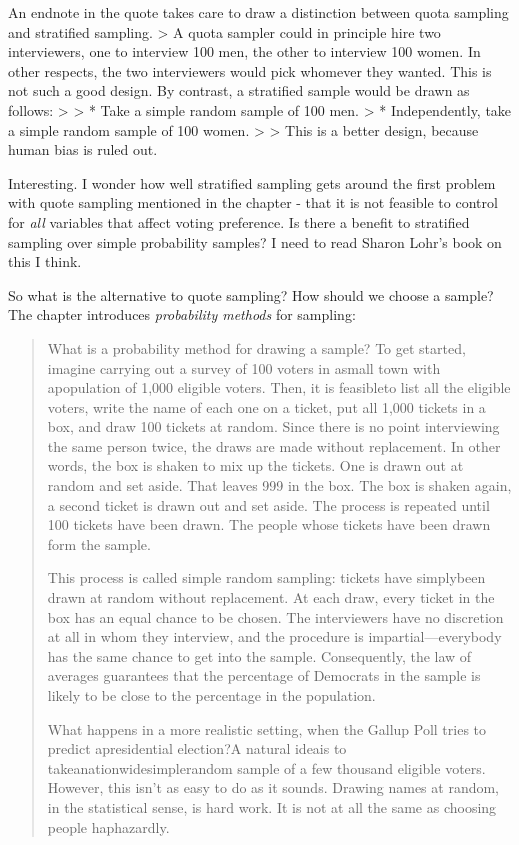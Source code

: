 \documentclass[
]{book}
\begin{document}
An endnote in the quote takes care to draw a distinction between quota sampling and stratified sampling.
\textgreater{} A quota sampler could in principle hire two interviewers, one to interview 100 men, the other to interview 100 women. In other respects, the two interviewers would pick whomever they wanted. This is not such a good design. By contrast, a stratified sample would be drawn as follows:
\textgreater{}
\textgreater{} * Take a simple random sample of 100 men.
\textgreater{} * Independently, take a simple random sample of 100 women.
\textgreater{}
\textgreater{} This is a better design, because human bias is ruled out.

Interesting. I wonder how well stratified sampling gets around the first problem with quote sampling mentioned in the chapter - that it is not feasible to control for \emph{all} variables that affect voting preference. Is there a benefit to stratified sampling over simple probability samples? I need to read Sharon Lohr's book on this I think.

So what is the alternative to quote sampling? How should we choose a sample? The chapter introduces \emph{probability methods} for sampling:

\begin{quote}
What is a probability method for drawing a sample? To get started, imagine carrying out a survey of 100 voters in asmall town with apopulation of 1,000 eligible voters. Then, it is feasibleto list all the eligible voters, write the name of each one on a ticket, put all 1,000 tickets in a box, and draw 100 tickets at random. Since there is no point interviewing the same person twice, the draws are made without replacement. In other words, the box is shaken to mix up the tickets. One is drawn out at random and set aside. That leaves 999 in the box. The box is shaken again, a second ticket is drawn out and set aside. The process is repeated until 100 tickets have been drawn. The people whose tickets have been drawn form the sample.

This process is called simple random sampling: tickets have simplybeen drawn at random without replacement. At each draw, every ticket in the box has an equal chance to be chosen. The interviewers have no discretion at all in whom they interview, and the procedure is impartial---everybody has the same chance to get into the sample. Consequently, the law of averages guarantees that the percentage of Democrats in the sample is likely to be close to the percentage in the population.

What happens in a more realistic setting, when the Gallup Poll tries to predict apresidential election?A natural ideais to takeanationwidesimplerandom sample of a few thousand eligible voters. However, this isn't as easy to do as it sounds. Drawing names at random, in the statistical sense, is hard work. It is not at all the same as choosing people haphazardly.
\end{quote}
\end{document}
